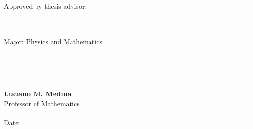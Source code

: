 \documentclass[12pt]{report}
\theoremstyle{definition}
\begin{document}
\begin{tabbing}

Approved by thesis advisor:

\hspace*{.50in} \=  \\

\> \\

\underline{Major}: Physics and Mathematics \\

\> \\
\> \\

\> \rule[0.0in]{2.5in}{0.01in} \\

\> \textbf{Luciano M. Medina} \\

\> Professor of Mathematics \\

\> \\

\>  Date: \underline{\hspace{2in}} \\
\end{tabbing}
\end{document}
